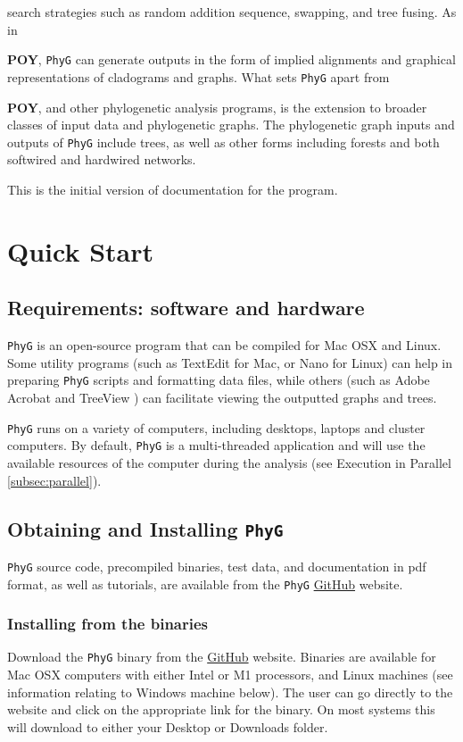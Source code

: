 \documentclass[11pt]{book}
\newcommand{\phyg}{\texttt{PhyG} }
\begin{document}
	search strategies such as random addition sequence, swapping, and tree fusing. As in {\textbf{POY}, 
	\phyg can generate outputs in the form of implied alignments and graphical representations of 
	cladograms and graphs. What sets \phyg apart from {\textbf{POY}, and other phylogenetic 
	analysis programs, is the extension to broader classes of input data and phylogenetic graphs. 
	The phylogenetic graph inputs and outputs of \texttt{PhyG} include trees, as well as other forms 
	including forests and both softwired and hardwired networks.
		
	This is the initial version of documentation for the program.

\section{Quick Start}
	
	\subsection{Requirements: software and hardware}
		\phyg is an open-source program that can be compiled for Mac OSX and Linux. Some 
		utility programs (such as TextEdit for Mac, or Nano for Linux) can help in preparing 
		\phyg scripts and formatting data files, while others (such as Adobe Acrobat and TreeView 
		\citep{page1996}) can facilitate viewing the outputted graphs and trees.
		
		\phyg runs on a variety of computers, including desktops, laptops and cluster computers.
		By default, \phyg is a multi-threaded application and will use the available resources of 
		the computer during the analysis (see Execution in Parallel \ref{subsec:parallel}). 
		
	\subsection{Obtaining and Installing \phyg}
		\phyg source code, precompiled binaries, test data, and documentation in pdf format, 
		as well as tutorials, are available from the \phyg \href{https://github.com/amnh/PhyGraph}{GitHub} 
		website.

	\subsubsection{Installing from the binaries}
		Download the \phyg binary from the \href{https://github.com/amnh/PhyGraph}{GitHub} 
		website. Binaries are available for Mac OSX computers with either Intel or M1 processors, 
		and Linux machines (see information relating to Windows machine below).
		The user can go directly to the website and click on the appropriate link 
		for the binary. On most systems this will download to either your Desktop or Downloads folder. \\
		
}}
\end{document}
